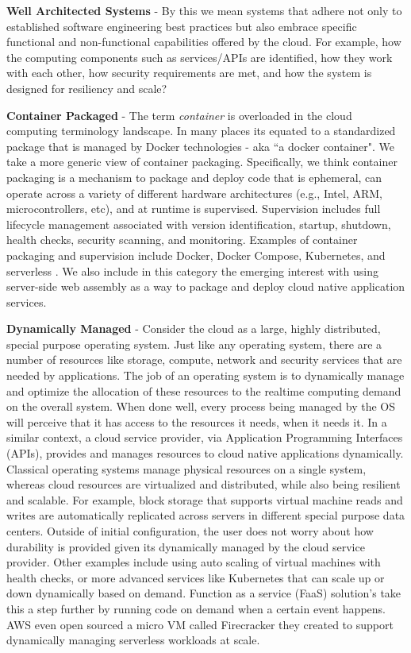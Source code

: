 \documentclass[conference]{IEEEtran}
\begin{document}
\textbf{Well Architected Systems} - By this we mean systems that adhere not only to established software engineering best practices but also embrace specific functional and non-functional capabilities offered by the cloud. For example, how the computing components such as services/APIs are identified, how they work with each other, how security requirements are met, and how the system is designed for resiliency and scale?

\textbf{Container Packaged} - The term \textit{container} is overloaded in the cloud computing terminology landscape.  In many places its equated to a standardized package\cite{OCIStandard} that is managed by Docker\cite{DockerContainer} technologies - aka ``a docker container".  We take a more generic view of container packaging. Specifically, we think container packaging is a mechanism to package and deploy code that is ephemeral, can operate across a variety of different hardware architectures (e.g., Intel, ARM, microcontrollers, etc), and at runtime is supervised.  Supervision includes full lifecycle management associated with version identification, startup, shutdown, health checks, security scanning, and monitoring.  Examples of container packaging and supervision include Docker, Docker Compose, Kubernetes, and serverless \cite{baldini2017serverless}. We also include in this category the emerging interest with using server-side web assembly\cite{haas2017bringing, bosshard2020use} as a way to package and deploy cloud native application services. 

\textbf{Dynamically Managed} - Consider the cloud as a large, highly distributed, special purpose operating system. Just like any operating system, there are a number of resources like storage, compute, network and security services that are needed by applications.  The job of an operating system is to dynamically manage and optimize the allocation of these resources to the realtime computing demand on the overall system.  When done well, every process being managed by the OS will perceive that it has access to the resources it needs, when it needs it.  In a similar context, a cloud service provider, via Application Programming Interfaces (APIs), provides and manages resources to cloud native applications dynamically. Classical operating systems manage physical resources on a single system, whereas cloud resources are virtualized and distributed, while also being resilient and scalable.  For example, block storage that supports virtual machine reads and writes are automatically replicated across servers in different special purpose data centers. Outside of initial configuration, the user does not worry about how durability is provided given its dynamically managed by the cloud service provider. Other examples include using auto scaling of virtual machines with health checks, or more advanced services like Kubernetes\cite{kubernetes} that can scale up or down dynamically based on demand. Function as a service (FaaS) solution's take this a step further by running code on demand when a certain event happens.  AWS even open sourced a micro VM called Firecracker\cite{AWSFirecracker} they created to support dynamically managing serverless workloads at scale.   
\end{document}
